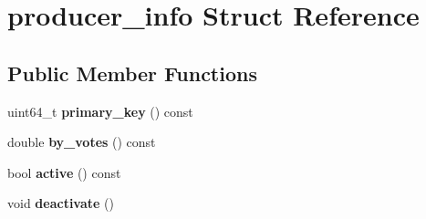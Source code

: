 \hypertarget{structproducer__info}{}\section{producer\+\_\+info Struct Reference}
\label{structproducer__info}
\subsection*{Public Member Functions}
\begin{DoxyCompactItemize}
\item 
\mbox{\label{structproducer__info_a123b853ad6eaac551d206fd1eacb98b6}} 
uint64\+\_\+t {\bfseries primary\+\_\+key} () const
\item 
\mbox{\label{structproducer__info_a864791e030cd80873c2f2f76dcf9dac1}} 
double {\bfseries by\+\_\+votes} () const
\item 
\mbox{\label{structproducer__info_a2a3b1632bbd8412ef28cfe746c580b1b}} 
bool {\bfseries active} () const
\item 
\mbox{\label{structproducer__info_aead564e246d81b1deec752ac734f523a}} 
void {\bfseries deactivate} ()
\end{DoxyCompactItemize}
